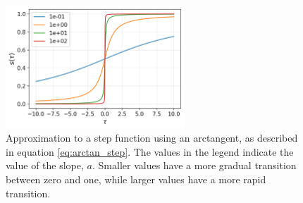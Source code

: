 \begin{figure}
    \begin{center}
    \includegraphics[width=0.6\textwidth]{figures/inversion/approx_step.png}
    \end{center}
\caption{
    Approximation to a step function using an arctangent, as described in equation
    \ref{eq:arctan_step}. The values in the legend indicate the value of the slope,
    $a$. Smaller values have a more gradual transition between zero and one, while
    larger values have a more rapid transition.
}
\label{fig:approx_step}
\end{figure}

